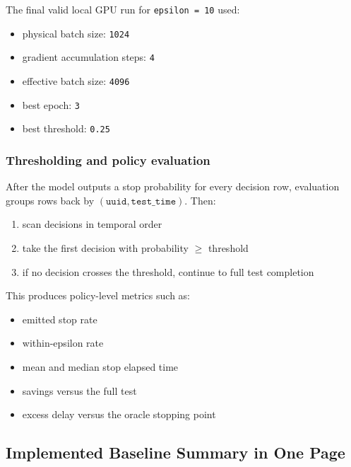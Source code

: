 \documentclass[11pt]{article}
\begin{document}
The final valid local GPU run for \texttt{epsilon = 10} used:
\begin{itemize}
\item physical batch size: \texttt{1024}
\item gradient accumulation steps: \texttt{4}
\item effective batch size: \texttt{4096}
\item best epoch: \texttt{3}
\item best threshold: \texttt{0.25}
\end{itemize}

\subsubsection*{Thresholding and policy evaluation}

After the model outputs a stop probability for every decision row, evaluation groups rows back by \((\texttt{uuid}, \texttt{test\_time})\). Then:
\begin{enumerate}
\item scan decisions in temporal order
\item take the first decision with probability \(\ge\) threshold
\item if no decision crosses the threshold, continue to full test completion
\end{enumerate}

This produces policy-level metrics such as:
\begin{itemize}
\item emitted stop rate
\item within-epsilon rate
\item mean and median stop elapsed time
\item savings versus the full test
\item excess delay versus the oracle stopping point
\end{itemize}

\subsection{Implemented Baseline Summary in One Page}
\end{document}
